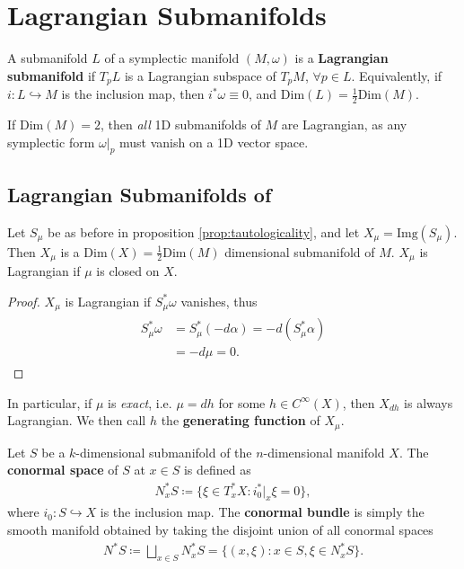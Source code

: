 \documentclass[11pt, final]{article}
\begin{document}
\section{Lagrangian Submanifolds}

\begin{definition}
	A submanifold $L$ of a symplectic manifold $(M,\omega)$ is a \textbf{Lagrangian submanifold} if $T_pL$ is a Lagrangian subspace of $T_pM$, $\forall p \in L$. Equivalently, if $i: L \hookrightarrow M$ is the inclusion map, then $i^*\omega \equiv 0$, and $\mathrm{Dim}(L) = \tfrac{1}{2} \mathrm{Dim}(M)$.
\end{definition}
\begin{remark}
	If $\mathrm{Dim}(M) = 2$, then \textit{all} 1D submanifolds of $M$ are Lagrangian, as any symplectic form $\omega|_p$ must vanish on a 1D vector space.
\end{remark}

\subsection{Lagrangian Submanifolds of }

\begin{prop}
	Let $S_\mu$ be as before in proposition \autoref{prop:tautologicality}, and let $X_\mu = \mathrm{Img}(S_\mu)$. Then $X_\mu$ is a $\mathrm{Dim}(X) = \tfrac{1}{2}\mathrm{Dim}(M)$ dimensional submanifold of $M$. $X_\mu$ is Lagrangian if $\mu$ is closed on $X$.
\end{prop}
\begin{proof}
	$X_\mu$ is Lagrangian if $S^*_\mu \omega$ vanishes, thus
		\begin{align}
			\begin{split}
				S^*_\mu \omega 
				&= S^*_\mu (-d\alpha) = -d \left( S^*_\mu \alpha \right) \\
				&= - d \mu = 0.
			\end{split}
		\end{align}
\end{proof}
\begin{remark}
	In particular, if $\mu$ is \textit{exact}, i.e. $\mu = dh$ for some $h \in C^\infty(X)$, then $X_{dh}$ is always Lagrangian. We then call $h$ the \textbf{generating function} of $X_\mu$.
\end{remark}

\begin{definition}
	Let $S$ be a $k$-dimensional submanifold of the $n$-dimensional manifold $X$. The \textbf{conormal space} of $S$ at $x \in S$ is defined as
		\begin{align}
			N_x^*S \coloneqq \{ \xi \in T^*_xX : i_0^*|_x \xi = 0 \},
		\end{align}
	where $i_0 : S \hookrightarrow X$ is the inclusion map.
	The \textbf{conormal bundle} is simply the smooth manifold obtained by taking the disjoint union of all conormal spaces
		\begin{align}
			N^*S \coloneqq \bigsqcup_{x \in S} N^*_xS = \{ (x,\xi) : x \in S, \xi \in N_x^*S\}.
		\end{align}
\end{definition}
\end{document}
